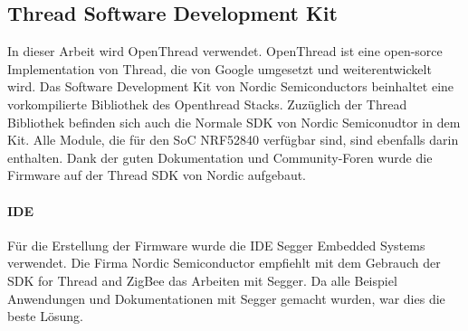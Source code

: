 \subsection{Thread Software Development Kit}\label{subsec:ThreadSoftwareDevelopmentKit}
In dieser Arbeit wird OpenThread verwendet. OpenThread ist eine open-sorce Implementation von Thread, die von Google umgesetzt und weiterentwickelt wird. Das Software Development Kit von Nordic Semiconductors beinhaltet eine vorkompilierte Bibliothek des Openthread Stacks. Zuzüglich der Thread Bibliothek befinden sich auch die Normale SDK von Nordic Semiconudtor in dem Kit. Alle Module, die für den SoC NRF52840 verfügbar sind, sind ebenfalls darin enthalten. Dank der guten Dokumentation und Community-Foren wurde die Firmware auf der Thread SDK von Nordic aufgebaut. 

\paragraph{IDE}
Für die Erstellung der Firmware wurde die IDE Segger Embedded Systems verwendet. Die Firma Nordic Semiconductor empfiehlt mit dem Gebrauch der SDK for Thread and ZigBee das Arbeiten mit Segger. Da alle Beispiel Anwendungen und Dokumentationen mit Segger gemacht wurden, war dies die beste Lösung.
